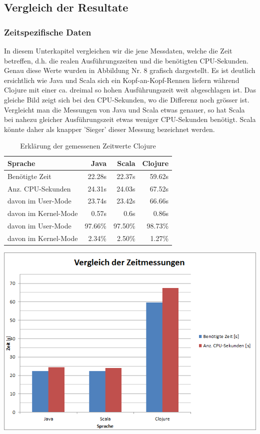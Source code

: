 \documentclass{fancydocument}
\begin{document}
\subsection{Vergleich der Resultate}
\subsubsection{Zeitspezifische Daten}
In diesem Unterkapitel vergleichen wir die jene Messdaten, welche die Zeit betreffen, d.h. die realen Ausführungszeiten und die benötigten CPU-Sekunden. Genau diese Werte wurden in Abbildung Nr. 8 grafisch dargestellt. Es ist deutlich ersichtlich wie Java und Scala sich ein Kopf-an-Kopf-Rennen liefern während Clojure mit einer ca. dreimal so hohen Ausführungszeit weit abgeschlagen ist. Das gleiche Bild zeigt sich bei den CPU-Sekunden, wo die Differenz noch grösser ist. Vergleicht man die Messungen von Java und Scala etwas genauer, so hat Scala bei nahezu gleicher Ausführungszeit etwas weniger CPU-Sekunden benötigt. Scala könnte daher als knapper 'Sieger' dieser Messung bezeichnet werden.
\begin{table}[h!]
\centering
\begin{tabular}{|p{6cm}|r|r|r|} \hline
Sprache & Java & Scala & Clojure \\
\hline
Benötigte Zeit & 22.28s & 22.37s & 59.62s\\
\hline
Anz. CPU-Sekunden & 24.31s & 24.03s & 67.52s\\
\hline
davon im User-Mode & 23.74s & 23.42s & 66.66s\\
\hline
davon im Kernel-Mode & 0.57s & 0.6s & 0.86s\\
\hline
davon im User-Mode & 97.66\% & 97.50\% & 98.73\%\\
\hline
davon im Kernel-Mode & 2.34\% & 2.50\% & 1.27\%\\
\hline
\end{tabular}
\caption{Erklärung der gemessenen Zeitwerte Clojure}
\end{table}
\begin{center}
\includegraphics[width=\linewidth]{bilder/TimeAll.png}
\end{center}
\end{document}
